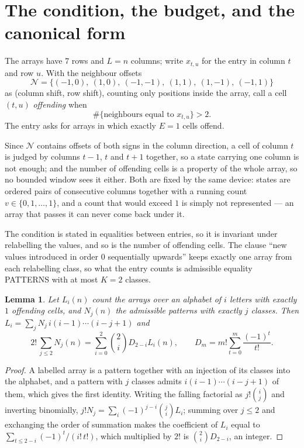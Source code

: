 \documentclass[11pt,a4paper]{article}
\theoremstyle{plain}
\newtheorem{lemma}[theorem]{Lemma}
\theoremstyle{definition}
\begin{document}
\section{The condition, the budget, and the canonical form}

The arrays have $7$ rows and $L=n$ columns; write $x_{t,u}$ for the entry in
column $t$ and row $u$. With the neighbour offsets
\[
\mathcal N=\{(-1,0),\ (1,0),\ (-1,-1),\ (1,1),\ (1,-1),\ (-1,1)\}
\]
as (column shift, row shift), counting only positions inside the array, call a cell
$(t,u)$ \emph{offending} when
\[
\#\{\text{neighbours equal to }x_{t,u}\}>2 .
\]
The entry asks for arrays in which exactly $E=1$ cells offend.

Since $\mathcal N$ contains offsets of both signs in the column direction, a cell of column
$t$ is judged by columns $t-1$, $t$ and $t+1$ together, so a state carrying one column is not
enough; and the number of offending cells is a property of the whole array, so no bounded
window sees it either. Both are fixed by the same device: states are ordered pairs of
consecutive columns together with a running count $v\in\{0,1,\dots,1\}$, and a count that
would exceed $1$ is simply not represented --- an array that passes it can never come back
under it.

The condition is stated in equalities between entries, so it is invariant under relabelling
the values, and so is the number of offending cells. The clause ``new values introduced in
order $0$ sequentially upwards'' keeps exactly one array from each relabelling class, so what
the entry counts is admissible equality PATTERNS with at most $K=2$ classes.

\begin{lemma}\label{lem:inv}
Let $L_i(n)$ count the arrays over an alphabet of $i$ letters with exactly $1$ offending
cells, and $N_j(n)$ the admissible patterns with exactly $j$ classes. Then
$L_i=\sum_j N_j\,i(i-1)\cdots(i-j+1)$ and
\[
2!\,\sum_{j\le2}N_j(n)=\sum_{i=0}^{2}\binom{2}{i}D_{2-i}L_i(n),
\qquad D_m=m!\sum_{t=0}^{m}\frac{(-1)^t}{t!} .
\]
\end{lemma}

\begin{proof}
A labelled array is a pattern together with an injection of its classes into the alphabet,
and a pattern with $j$ classes admits $i(i-1)\cdots(i-j+1)$ of them, which gives the first
identity. Writing the falling factorial as $j!\binom{i}{j}$ and inverting binomially,
$j!N_j=\sum_i(-1)^{j-i}\binom{j}{i}L_i$; summing over $j\le2$ and exchanging the
order of summation makes the coefficient of $L_i$ equal to
$\sum_{t\le2-i}(-1)^t/(i!\,t!)$, which multiplied by $2!$ is
$\binom{2}{i}D_{2-i}$, an integer.
\end{proof}
\end{document}
